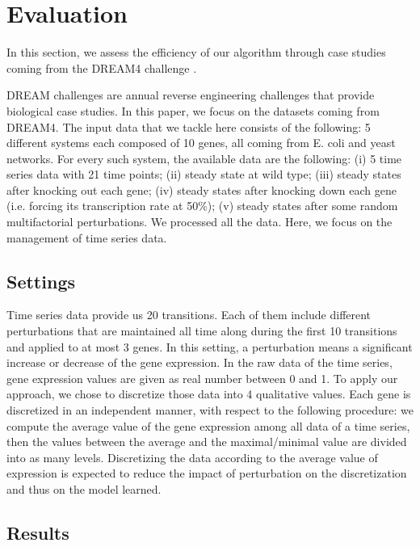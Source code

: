 \section{Evaluation}
	\label{sec:evaluation}
	
	In this section, we assess the efficiency of our algorithm through case studies coming from the DREAM4 challenge \cite{prill2011crowdsourcing}.

	DREAM challenges are annual reverse engineering challenges that provide biological case studies.
	In this paper, we focus on the datasets coming from DREAM4.
	The input data that we tackle here consists of the following:
	5 different systems each composed of 10 genes, all coming from E. coli and yeast networks. For every such system,
	the available data are the following: (i) 5 time series data with 21 time points; (ii) steady state at wild type;
	(iii) steady states after knocking out each gene;
	(iv) steady states after knocking down each gene (i.e. forcing its transcription rate at 50\%);
	(v) steady states after some random multifactorial perturbations. We processed all the data.
	Here, we focus on the management of time series data.

\subsection{Settings}

	Time series data provide us 20 transitions.
	Each of them include different perturbations that are maintained all time along during the first 10 transitions and applied to at most 3 genes.
	In this setting, a perturbation means a significant increase or decrease of the gene expression.
	In the raw data of the time series, gene expression values are given as real number between 0 and 1.
	To apply our approach, we chose to discretize those data into 4 qualitative values.
	Each gene is discretized in an independent manner, with respect to the following procedure:
	we compute the average value of the gene expression among all data of a time series,
	then the values between the average and the maximal/minimal value are divided into as many levels.
	Discretizing the data according to the average value of expression is expected to reduce the impact of perturbation on the discretization and thus on the model learned.

\subsection{Results}
